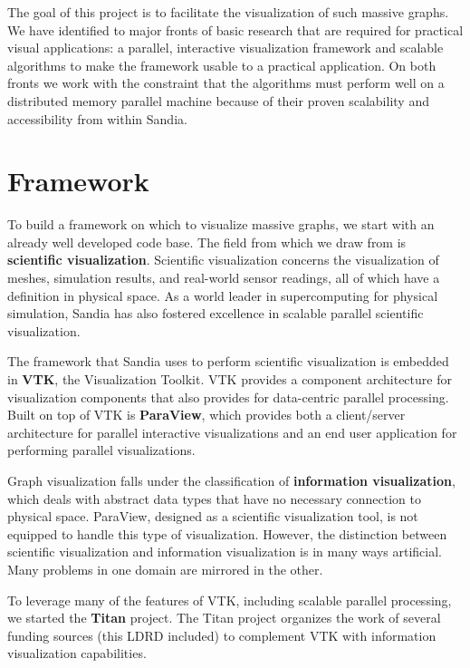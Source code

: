 \documentclass[pdf,12pt,report,strict]{SANDreport}
\newcommand{\titan}{Titan\xspace}
\newcommand*{\keyterm}[1]{\textbf{#1}}
\begin{document}
The goal of this project is to facilitate the visualization of such massive
graphs.  We have identified to major fronts of basic research that are
required for practical visual applications: a parallel, interactive
visualization framework and scalable algorithms to make the framework
usable to a practical application.  On both fronts we work with the
constraint that the algorithms must perform well on a distributed memory
parallel machine because of their proven scalability and accessibility
from within Sandia.

\section{Framework}

To build a framework on which to visualize massive graphs, we start with an
already well developed code base.  The field from which we draw from is
\keyterm{scientific visualization}.
Scientific visualization concerns the visualization of meshes, simulation
results, and real-world sensor readings, all of which have a definition in
physical space.  As a world leader in supercomputing for physical
simulation, Sandia has also fostered excellence in scalable parallel
scientific visualization.


The framework that Sandia uses to perform scientific visualization is
embedded in \keyterm{VTK}, the Visualization Toolkit.  VTK
provides a component architecture for visualization components that also
provides for data-centric parallel processing.  Built on top of VTK is
\keyterm{ParaView}, which provides both a client/server
architecture for parallel interactive visualizations and an end user
application for performing parallel visualizations.

Graph visualization falls under the classification of
\keyterm{information visualization}, which
deals with abstract data types that have no necessary connection to
physical space.  ParaView, designed as a scientific visualization tool, is
not equipped to handle this type of visualization.  However, the distinction
between scientific visualization and information visualization is in many
ways artificial.  Many problems in one domain are mirrored in the other.

To leverage many of the features of VTK, including scalable parallel
processing, we started the \index{Titan@\titan}\keyterm{\titan} project.
The \titan project organizes the work of several funding sources (this LDRD
included) to complement VTK with information visualization capabilities.
\end{document}
